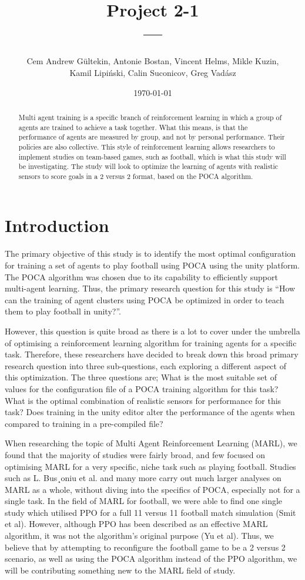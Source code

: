 \documentclass{LSkill}
\title{Project 2-1 \\ \large{---}}
\author{
    Cem Andrew Gültekin, Antonie Bostan, Vincent Helms, Mikle Kuzin, \\ 
    Kamil Lipiński, Calin Suconicov, Greg Vadász
}
\date{\today}
\begin{document}
\maketitle
\tableofcontents

\begin{abstract}
Multi agent training is a specific branch of reinforcement learning in which a group of agents are trained to achieve a task together. What this means, is that the performance of agents are measured by group, and not by personal performance. Their policies are also collective. This style of reinforcement learning allows researchers to implement studies on team-based games, such as football, which is what this study will be investigating. The study will look to optimize the learning of agents with realistic sensors to score goals in a 2 versus 2 format, based on the POCA algorithm. 
\end{abstract}

\section{Introduction}
The primary objective of this study is to identify the most optimal configuration for training a set of agents to play football using POCA using the unity platform. The POCA algorithm was chosen due to its capability to efficiently support multi-agent learning. Thus, the primary research question for this study is “How can the training of agent clusters using POCA be optimized in order to teach them to play football in unity?”.

However, this question is quite broad as there is a lot to cover under the umbrella of optimising a reinforcement learning algorithm for training agents for a specific task. Therefore, these researchers have decided to break down this broad primary research question into three sub-questions, each exploring a different aspect of this optimization. The three questions are; What is the most suitable set of values for the configuration file of a POCA training algorithm for this task? What is the optimal combination of realistic sensors for performance for this task? Does training in the unity editor alter the performance of the agents when compared to training in a pre-compiled file? 

When researching the topic of Multi Agent Reinforcement Learning (MARL), we found that the majority of studies were fairly broad, and few focused on optimising MARL for a very specific, niche task such as playing football. Studies such as L. Bus¸oniu et al. and many more carry out much larger analyses on MARL as a whole, without diving into the specifics of POCA, especially not for a single task. In the field of MARL for football, we were able to find one single study which utilised PPO for a full 11 versus 11 football match simulation (Smit et al). However, although PPO has been described as an effective MARL algorithm, it was not the algorithm’s original purpose (Yu et al). Thus, we believe that by attempting to reconfigure the football game to be a 2 versus 2 scenario, as well as using the POCA algorithm instead of the PPO algorithm, we will be contributing something new to the MARL field of study.
\end{document}
